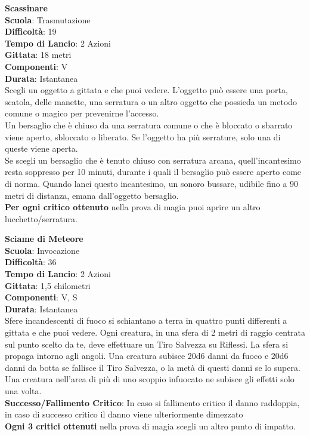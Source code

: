 \begin{multicols}{2}
\medskip\textbf{Scassinare}\\
\textbf{Scuola}: Trasmutazione\\
\textbf{Difficoltà}: 19\\
\textbf{Tempo di Lancio}: 2 Azioni\\
\textbf{Gittata}: 18 metri\\
\textbf{Componenti}: V\\
\textbf{Durata}: Istantanea\\
Scegli un oggetto a gittata e che puoi vedere. L'oggetto può essere una porta, scatola, delle manette, una serratura o un altro oggetto che possieda un metodo comune o magico per prevenirne l'accesso.\\
Un bersaglio che è chiuso da una serratura comune o che è bloccato o sbarrato viene aperto, sbloccato o liberato. Se l'oggetto ha più serrature, solo una di queste viene aperta.\\
Se scegli un bersaglio che è tenuto chiuso con serratura arcana, quell'incantesimo resta soppresso per 10 minuti, durante i quali il bersaglio può essere aperto come di norma. Quando lanci questo incantesimo, un sonoro bussare, udibile fino a 90 metri di distanza, emana dall'oggetto bersaglio.\\
\textbf{Per ogni critico ottenuto} nella prova di magia puoi aprire un altro lucchetto/serratura.

\medskip\textbf{Sciame di Meteore}\\
\textbf{Scuola}: Invocazione\\
\textbf{Difficoltà}: 36\\
\textbf{Tempo di Lancio}: 2 Azioni\\
\textbf{Gittata}: 1,5 chilometri\\
\textbf{Componenti}: V, S\\
\textbf{Durata}: Istantanea\\
Sfere incandescenti di fuoco si schiantano a terra in quattro punti differenti a gittata e che puoi vedere. Ogni creatura, in una sfera di 2 metri di raggio centrata sul punto scelto da te, deve effettuare un Tiro Salvezza su Riflessi. La sfera si propaga intorno agli angoli. Una creatura subisce 20d6 danni da fuoco e 20d6 danni da botta se fallisce il Tiro Salvezza, o la metà di
questi danni se lo supera. Una creatura nell'area di più di uno scoppio infuocato ne subisce gli effetti solo una volta.\\
\textbf{Successo/Fallimento Critico}: In caso si fallimento critico il danno raddoppia, in caso di successo critico il danno viene ulteriormente dimezzato\\
\textbf{Ogni 3 critici ottenuti} nella prova di magia scegli un altro punto di impatto.


\end{multicols}
